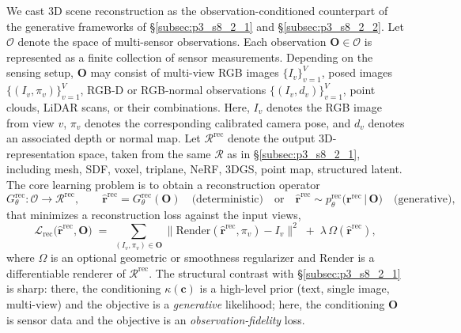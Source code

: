 We cast 3D scene reconstruction as the observation-conditioned counterpart of the generative frameworks of §\ref{subsec:p3_s8_2_1} and §\ref{subsec:p3_s8_2_2}.
Let $\mathcal{O}$ denote the space of multi-sensor observations.
Each observation $\mathbf{O}\in\mathcal{O}$ is represented as a finite collection of sensor measurements.
Depending on the sensing setup, $\mathbf{O}$ may consist of multi-view RGB images $\{I_v\}_{v=1}^{V}$, posed images $\{(I_v,\pi_v)\}_{v=1}^{V}$, RGB-D or RGB-normal observations $\{(I_v,d_v)\}_{v=1}^{V}$, point clouds, LiDAR scans, or their combinations.
Here, $I_v$ denotes the RGB image from view $v$, $\pi_v$ denotes the corresponding calibrated camera pose, and $d_v$ denotes an associated depth or normal map.
Let $\mathcal{R}^{\text{rec}}$ denote the output 3D-representation space, taken from the same $\mathcal{R}$ as in §\ref{subsec:p3_s8_2_1}, including mesh, SDF, voxel, triplane, NeRF, 3DGS, point map, structured latent.
The core learning problem is to obtain a reconstruction operator
\begin{equation}
G_\theta^{\text{rec}}:\mathcal{O}\rightarrow \mathcal{R}^{\text{rec}},
\qquad
\hat{\mathbf{r}}^{\text{rec}} = G_\theta^{\text{rec}}(\mathbf{O}) \quad \text{(deterministic)}
\quad \text{or} \quad
\hat{\mathbf{r}}^{\text{rec}}\sim p_\theta^{\text{rec}}\!\big(\mathbf{r}^{\text{rec}}\,\big|\,\mathbf{O}\big) \quad \text{(generative)},
\label{eq:p3_s8_2_3_objective}
\end{equation}
that minimizes a reconstruction loss against the input views,
\begin{equation}
\mathcal{L}_{\text{rec}}\big(\hat{\mathbf{r}}^{\text{rec}},\mathbf{O}\big)
\;=\;
\sum_{(I_v,\pi_v)\in\mathbf{O}} \big\|\mathrm{Render}(\hat{\mathbf{r}}^{\text{rec}},\pi_v) - I_v\big\|^2
\;+\; \lambda\,\Omega(\hat{\mathbf{r}}^{\text{rec}}),
\label{eq:p3_s8_2_3_loss}
\end{equation}
where $\Omega$ is an optional geometric or smoothness regularizer and $\mathrm{Render}$ is a differentiable renderer of $\mathcal{R}^{\text{rec}}$.
The structural contrast with §\ref{subsec:p3_s8_2_1} is sharp: there, the conditioning $\kappa(\mathbf{c})$ is a high-level prior (text, single image, multi-view) and the objective is a \emph{generative} likelihood; here, the conditioning $\mathbf{O}$ is sensor data and the objective is an \emph{observation-fidelity} loss.


